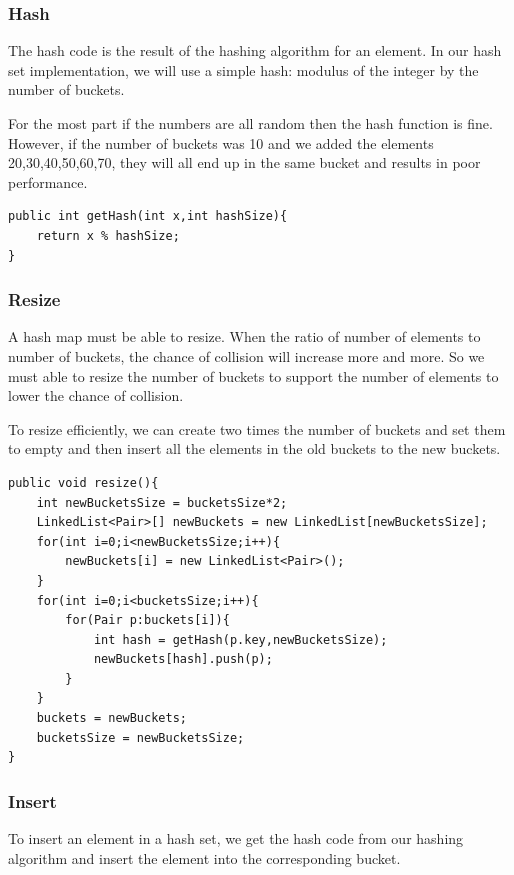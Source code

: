 \documentclass[11pt,oneside]{book}
\begin{document}
\subsubsection{Hash}

The hash code is the result of the hashing algorithm for an element. In our hash set implementation, we will use a simple hash: modulus of the integer by the number of buckets.

For the most part if the numbers are all random then the hash function is fine. However, if the number of buckets was 10 and we added the elements 20,30,40,50,60,70, they will all end up in the same bucket and results in poor performance.

\begin{lstlisting}
public int getHash(int x,int hashSize){
    return x % hashSize;
}
\end{lstlisting}

\subsubsection{Resize}

A hash map must be able to resize. When the ratio of number of elements to number of buckets, the chance of collision will increase more and more. So we must able to resize the number of buckets to support the number of elements to lower the chance of collision.

To resize efficiently, we can create two times the number of buckets and set them to empty and then insert all the elements in the old buckets to the new buckets.

\begin{lstlisting}
public void resize(){
    int newBucketsSize = bucketsSize*2;
    LinkedList<Pair>[] newBuckets = new LinkedList[newBucketsSize];
    for(int i=0;i<newBucketsSize;i++){
        newBuckets[i] = new LinkedList<Pair>();
    }
    for(int i=0;i<bucketsSize;i++){
        for(Pair p:buckets[i]){
            int hash = getHash(p.key,newBucketsSize);
            newBuckets[hash].push(p);
        }
    }
    buckets = newBuckets;
    bucketsSize = newBucketsSize;
}
\end{lstlisting}

\subsubsection{Insert}

To insert an element in a hash set, we get the hash code from our hashing algorithm and insert the element into the corresponding bucket.
\end{document}
